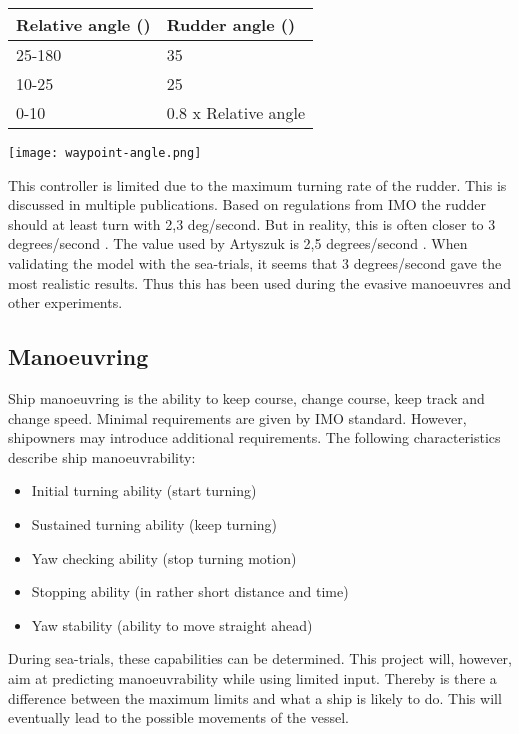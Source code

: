 \begin{minipage}{\textwidth}
	\begin{minipage}[b]{0.52\textwidth}
		\centering
		\begin{tabular}{l|l}
			\toprule
			Relative angle (\degree) & Rudder angle (\degree) \\
			\midrule
			25-180 & 35\\
			10-25 & 25\\
			0-10 & 0.8 x Relative angle \\
			\bottomrule
		\end{tabular}
		
		\label{tab:Rudder-angle}
	\end{minipage}
	\hfill
	\begin{minipage}[b]{0.47\textwidth}
		\centering
		\texttt{[image: waypoint-angle.png]}
		\label{fig:waypoint-angle}
	\end{minipage}
\end{minipage}

This controller is limited due to the maximum turning rate of the rudder. This is discussed in multiple publications. Based on regulations from IMO the rudder should at least turn with 2,3 deg/second. But in reality, this is often closer to 3 degrees/second \cite{Molland2007}. The value used by Artyszuk is 2,5 degrees/second \cite{Artyszuk2016}. When validating the model with the sea-trials, it seems that 3 degrees/second gave the most realistic results. Thus this has been used during the evasive manoeuvres and other experiments.



\subsection{Manoeuvring}
\label{apps:hydro-model}
Ship manoeuvring is the ability to keep course, change course, keep track and change speed. Minimal requirements are given by \ac{IMO} standard. However, shipowners may introduce additional requirements. 
The following characteristics describe ship manoeuvrability: 
\begin{itemize}
	\item Initial turning ability (start turning)
	\item Sustained turning ability (keep turning)
	\item Yaw checking ability (stop turning motion)
	\item Stopping ability (in rather short distance and time)
	\item Yaw stability (ability to move straight ahead)
\end{itemize}
During sea-trials, these capabilities can be determined. This project will, however, aim at predicting manoeuvrability while using limited input. Thereby is there a difference between the maximum limits and what a ship is likely to do. This will eventually lead to the possible movements of the vessel.

